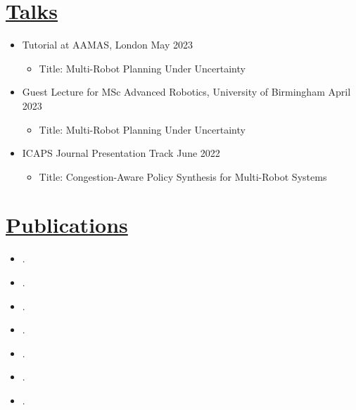 \documentclass[11pt]{article}
\begin{document}
\section*{\underline{Talks}}
\begin{itemize}
\item Tutorial at AAMAS, London \hfill May 2023
\begin{itemize}
\item Title: Multi-Robot Planning Under Uncertainty
\end{itemize}
\item Guest Lecture for MSc Advanced Robotics, University of Birmingham \hfill April 2023
\begin{itemize}
\item Title: Multi-Robot Planning Under Uncertainty
\end{itemize}
\item ICAPS Journal Presentation Track \hfill June 2022
\begin{itemize}
\item Title: Congestion-Aware Policy Synthesis for Multi-Robot Systems
\end{itemize}
\end{itemize}

\section*{\underline{Publications}}
\begin{itemize}
\item[\cite{street2023formal}] .
\item[\cite{zhang2023multi}] .
\item[\cite{street2023analysing}] .
\item[\cite{lacerda2022decision}] .
\item[\cite{street2022context}] .
\item[\cite{street2021congestion}] .	
\item[\cite{street2020multi}] .
\end{itemize}
\end{document}
